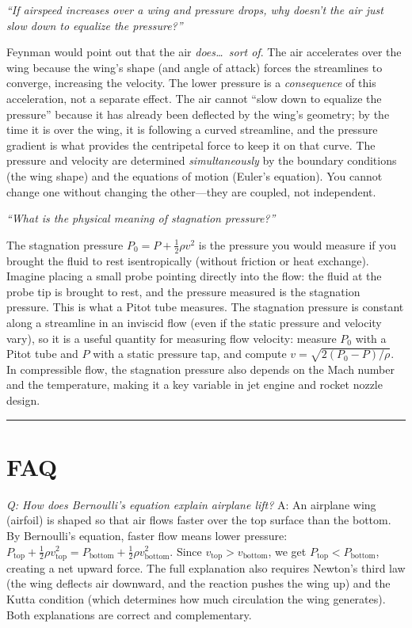 \textit{``If airspeed increases over a wing and pressure drops, why doesn't the air just slow down to equalize the pressure?''}

Feynman would point out that the air \emph{does\ldots\ sort of}. The air accelerates over the wing because the wing's shape (and angle of attack) forces the streamlines to converge, increasing the velocity. The lower pressure is a \emph{consequence} of this acceleration, not a separate effect. The air cannot ``slow down to equalize the pressure'' because it has already been deflected by the wing's geometry; by the time it is over the wing, it is following a curved streamline, and the pressure gradient is what provides the centripetal force to keep it on that curve. The pressure and velocity are determined \emph{simultaneously} by the boundary conditions (the wing shape) and the equations of motion (Euler's equation). You cannot change one without changing the other---they are coupled, not independent.

\textit{``What is the physical meaning of stagnation pressure?''}

The stagnation pressure $P_0 = P + \frac{1}{2}\rho v^2$ is the pressure you would measure if you brought the fluid to rest isentropically (without friction or heat exchange). Imagine placing a small probe pointing directly into the flow: the fluid at the probe tip is brought to rest, and the pressure measured is the stagnation pressure. This is what a Pitot tube measures. The stagnation pressure is constant along a streamline in an inviscid flow (even if the static pressure and velocity vary), so it is a useful quantity for measuring flow velocity: measure $P_0$ with a Pitot tube and $P$ with a static pressure tap, and compute $v = \sqrt{2(P_0 - P)/\rho}$. In compressible flow, the stagnation pressure also depends on the Mach number and the temperature, making it a key variable in jet engine and rocket nozzle design.

\bigskip
\hrule
\bigskip
\section*{FAQ}

\textit{Q: How does Bernoulli's equation explain airplane lift?}
A: An airplane wing (airfoil) is shaped so that air flows faster over the top surface than the bottom. By Bernoulli's equation, faster flow means lower pressure: $P_{\text{top}} + \frac{1}{2}\rho v_{\text{top}}^2 = P_{\text{bottom}} + \frac{1}{2}\rho v_{\text{bottom}}^2$. Since $v_{\text{top}} > v_{\text{bottom}}$, we get $P_{\text{top}} < P_{\text{bottom}}$, creating a net upward force. The full explanation also requires Newton's third law (the wing deflects air downward, and the reaction pushes the wing up) and the Kutta condition (which determines how much circulation the wing generates). Both explanations are correct and complementary.

